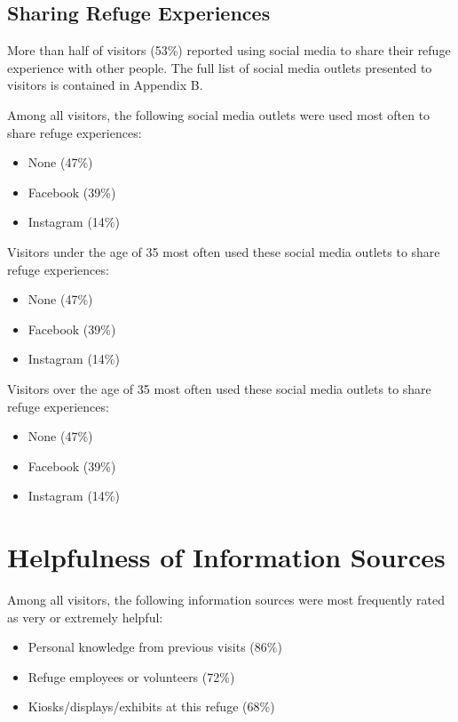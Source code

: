 \documentclass[]{book}
\providecommand{\tightlist}{%
  \setlength{\itemsep}{0pt}\setlength{\parskip}{0pt}}
\begin{document}
\hypertarget{right}{}
\subsection*{Sharing Refuge
Experiences}\label{sharing-refuge-experiences}

More than half of visitors (53\%) reported using social media to share
their refuge experience with other people. The full list of social media
outlets presented to visitors is contained in Appendix B.

Among all visitors, the following social media outlets were used most
often to share refuge experiences:

\begin{itemize}
\tightlist
\item
  None (47\%)
\item
  Facebook (39\%)
\item
  Instagram (14\%)
\end{itemize}

Visitors under the age of 35 most often used these social media outlets
to share refuge experiences:

\begin{itemize}
\tightlist
\item
  None (47\%)
\item
  Facebook (39\%)
\item
  Instagram (14\%)
\end{itemize}

Visitors over the age of 35 most often used these social media outlets
to share refuge experiences:

\begin{itemize}
\tightlist
\item
  None (47\%)
\item
  Facebook (39\%)
\item
  Instagram (14\%)
\end{itemize}

\section*{Helpfulness of Information
Sources}\label{helpfulness-of-information-sources}

Among all visitors, the following information sources were most
frequently rated as very or extremely helpful:

\begin{itemize}
\tightlist
\item
  Personal knowledge from previous visits (86\%)
\item
  Refuge employees or volunteers (72\%)
\item
  Kiosks/displays/exhibits at this refuge (68\%)
\end{itemize}
\end{document}
